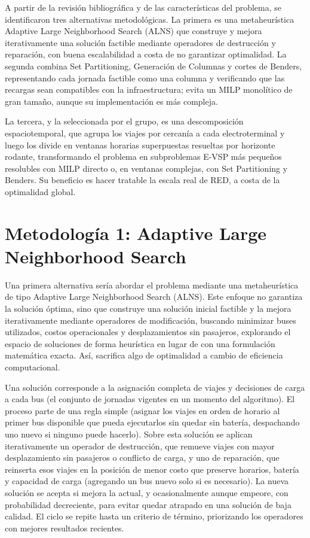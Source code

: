 A partir de la revisi\'on bibliogr\'afica \cite{alvo2021,perumal2022,picarelli2020,vankootenniekerk2017,zhang2024} y de las caracter\'isticas del problema, se identificaron tres alternativas metodol\'ogicas. La primera es una metaheur\'istica Adaptive Large Neighborhood Search (ALNS) que construye y mejora iterativamente una soluci\'on factible mediante operadores de destrucci\'on y reparaci\'on, con buena escalabilidad a costa de no garantizar optimalidad. La segunda combina Set Partitioning, Generaci\'on de Columnas y cortes de Benders, representando cada jornada factible como una columna y verificando que las recargas sean compatibles con la infraestructura; evita un MILP monol\'itico de gran tama\~no, aunque su implementaci\'on es m\'as compleja.

La tercera, y la seleccionada por el grupo, es una descomposici\'on espaciotemporal, que agrupa los viajes por cercan\'ia a cada electroterminal y luego los divide en ventanas horarias superpuestas resueltas por horizonte rodante, transformando el problema en subproblemas E-VSP m\'as peque\~nos resolubles con MILP directo o, en ventanas complejas, con Set Partitioning y Benders. Su beneficio es hacer tratable la escala real de RED, a costa de la optimalidad global.

\section{Metodolog\'ia 1: Adaptive Large Neighborhood Search \label{sec:metodologia1}}

Una primera alternativa ser\'ia abordar el problema mediante una metaheur\'istica de tipo Adaptive Large Neighborhood Search (ALNS). Este enfoque no garantiza la soluci\'on \'optima, sino que construye una soluci\'on inicial factible y la mejora iterativamente mediante operadores de modificaci\'on, buscando minimizar buses utilizados, costos operacionales y desplazamientos sin pasajeros, explorando el espacio de soluciones de forma heur\'istica en lugar de con una formulaci\'on matem\'atica exacta. As\'i, sacrifica algo de optimalidad a cambio de eficiencia computacional.

Una soluci\'on corresponde a la asignaci\'on completa de viajes y decisiones de carga a cada bus (el conjunto de jornadas vigentes en un momento del algoritmo). El proceso parte de una regla simple (asignar los viajes en orden de horario al primer bus disponible que pueda ejecutarlos sin quedar sin bater\'ia, despachando uno nuevo si ninguno puede hacerlo). Sobre esta soluci\'on se aplican iterativamente un operador de destrucci\'on, que remueve viajes con mayor desplazamiento sin pasajeros o conflicto de carga, y uno de reparaci\'on, que reinserta esos viajes en la posici\'on de menor costo que preserve horarios, bater\'ia y capacidad de carga (agregando un bus nuevo solo si es necesario). La nueva soluci\'on se acepta si mejora la actual, y ocasionalmente aunque empeore, con probabilidad decreciente, para evitar quedar atrapado en una soluci\'on de baja calidad. El ciclo se repite hasta un criterio de t\'ermino, priorizando los operadores con mejores resultados recientes.


